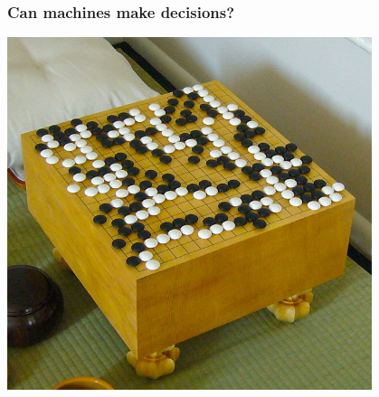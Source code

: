 \documentclass{beamer}
\begin{document}

\begin{frame}
  \frametitle{Can machines make decisions?}
  \begin{center}
    \includegraphics[width=0.8\textwidth]{figures/619px-FloorGoban}
  \end{center}
\end{frame}

\end{document}
